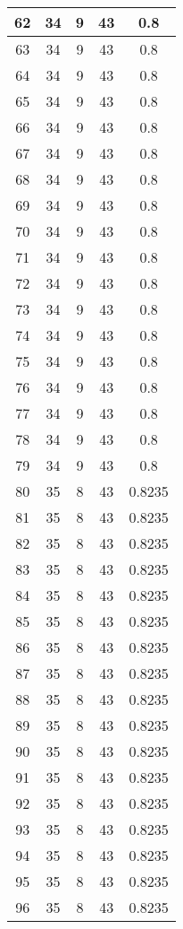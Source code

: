 \documentclass[letterpaper, 12pt]{article}
\begin{document}
\begin{longtable}{|c|c|c|c|c|}
\hline
62 & 34 & 9 & 43 & 0.8 \\
\hline
63 & 34 & 9 & 43 & 0.8 \\
\hline
64 & 34 & 9 & 43 & 0.8 \\
\hline
65 & 34 & 9 & 43 & 0.8 \\
\hline
66 & 34 & 9 & 43 & 0.8 \\
\hline
67 & 34 & 9 & 43 & 0.8 \\
\hline
68 & 34 & 9 & 43 & 0.8 \\
\hline
69 & 34 & 9 & 43 & 0.8 \\
\hline
70 & 34 & 9 & 43 & 0.8 \\
\hline
71 & 34 & 9 & 43 & 0.8 \\
\hline
72 & 34 & 9 & 43 & 0.8 \\
\hline
73 & 34 & 9 & 43 & 0.8 \\
\hline
74 & 34 & 9 & 43 & 0.8 \\
\hline
75 & 34 & 9 & 43 & 0.8 \\
\hline
76 & 34 & 9 & 43 & 0.8 \\
\hline
77 & 34 & 9 & 43 & 0.8 \\
\hline
78 & 34 & 9 & 43 & 0.8 \\
\hline
79 & 34 & 9 & 43 & 0.8 \\
\hline
80 & 35 & 8 & 43 & 0.8235 \\
\hline
81 & 35 & 8 & 43 & 0.8235 \\
\hline
82 & 35 & 8 & 43 & 0.8235 \\
\hline
83 & 35 & 8 & 43 & 0.8235 \\
\hline
84 & 35 & 8 & 43 & 0.8235 \\
\hline
85 & 35 & 8 & 43 & 0.8235 \\
\hline
86 & 35 & 8 & 43 & 0.8235 \\
\hline
87 & 35 & 8 & 43 & 0.8235 \\
\hline
88 & 35 & 8 & 43 & 0.8235 \\
\hline
89 & 35 & 8 & 43 & 0.8235 \\
\hline
90 & 35 & 8 & 43 & 0.8235 \\
\hline
91 & 35 & 8 & 43 & 0.8235 \\
\hline
92 & 35 & 8 & 43 & 0.8235 \\
\hline
93 & 35 & 8 & 43 & 0.8235 \\
\hline
94 & 35 & 8 & 43 & 0.8235 \\
\hline
95 & 35 & 8 & 43 & 0.8235 \\
\hline
96 & 35 & 8 & 43 & 0.8235 \\

\end{longtable}
\end{document}
